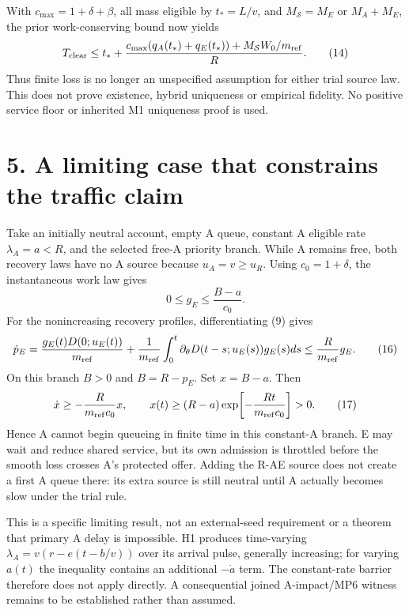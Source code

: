 \documentclass[11pt,a4paper]{article}
\begin{document}
With $c_{\max}=1+\delta+\beta$, all mass eligible by $t_*=L/v$, and
$M_{\mathcal S}=M_E$ or $M_A+M_E$, the prior work-conserving bound now yields
\begin{equation}
 T_{\rm clear}\leq t_*+
 \frac{c_{\max}(q_A(t_*)+q_E(t_*))+M_{\mathcal S}W_0/m_{\rm ref}}R.
 \tag{14}
\end{equation}
Thus finite loss is no longer an unspecified assumption for either trial
source law. This does not prove existence, hybrid uniqueness or empirical
fidelity. No positive service floor or inherited M1 uniqueness proof is used.

\newpage
\section*{5. A limiting case that constrains the traffic claim}

Take an initially neutral account, empty A queue, constant A eligible rate
$\lambda_A=a<R$, and the selected free-A priority branch. While A remains
free, both recovery laws have no A source because $u_A=v\geq u_R$.
Using $c_0=1+\delta$, the instantaneous work law gives
\begin{equation}
 0\leq g_E\leq\frac{B-a}{c_0}. \tag{15}
\end{equation}
For the nonincreasing recovery profiles, differentiating (9) gives
\begin{equation}
 \dot p_E=\frac{g_E(t)D(0;u_E(t))}{m_{\rm ref}}+
 \frac1{m_{\rm ref}}\int_0^t
 \partial_\theta D(t-s;u_E(s))g_E(s)ds
 \leq\frac{R}{m_{\rm ref}}g_E. \tag{16}
\end{equation}
On this branch $B>0$ and $B=R-p_E$. Set $x=B-a$. Then
\begin{equation}
 \dot x\geq-\frac{R}{m_{\rm ref}c_0}x,\qquad
 x(t)\geq(R-a)\exp\!\left[-\frac{Rt}{m_{\rm ref}c_0}\right]>0.
 \tag{17}
\end{equation}
Hence A cannot begin queueing in finite time in this constant-A branch.
E may wait and reduce shared service, but its own admission is throttled
before the smooth loss crosses A's protected offer. Adding the R-AE source
does not create a first A queue there: its extra source is still neutral
until A actually becomes slow under the trial rule.

This is a specific limiting result, not an external-seed requirement or
a theorem that primary A delay is impossible. H1 produces time-varying
$\lambda_A=v(r-e(t-b/v))$ over its arrival pulse, generally increasing;
for varying $a(t)$ the inequality contains an additional $-\dot a$ term.
The constant-rate barrier therefore does not apply directly. A consequential
joined A-impact/MP6 witness remains to be established rather than assumed.
\end{document}
